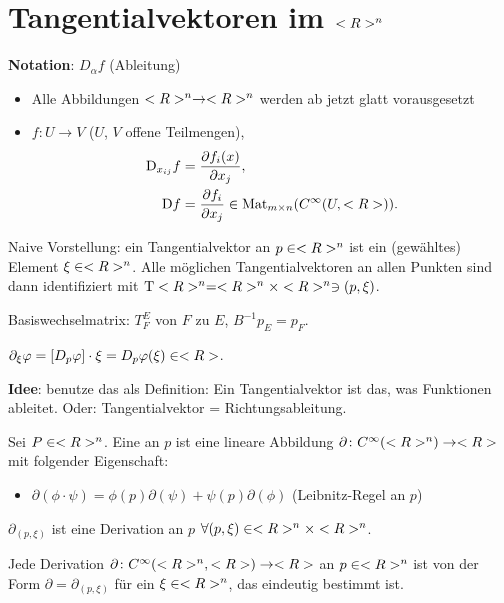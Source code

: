 \section{Tangentialvektoren im \texorpdfstring{$<R>^n$}{Rn}}

\textbf{Notation}: $D_\alpha f$ (Ableitung)\begin{itemize}
	\item Alle Abbildungen $<R>^n\to<R>^n$ werden ab jetzt glatt vorausgesetzt
	\item $f\colon U\to V$ ($U$, $V$ offene Teilmengen), \begin{align*}
		\mathrm D_{x_{ij}} f &= \frac{\partial f_i(x)}{\partial x_j},\\
		\mathrm D f &= \frac{\partial f_i}{\partial x_j}\in \operatorname{Mat}_{m\times n}(C^\infty(U,<R>)).
	\end{align*}
\end{itemize}

Naive Vorstellung: ein Tangentialvektor an $p\in<R>^n$ ist ein (gewähltes) Element $\xi\in<R>^n$. Alle möglichen Tangentialvektoren an allen Punkten sind dann identifiziert mit $\operatorname{T}<R>^n = <R>^n\times <R>^n\ni (p,\xi)$.

Basiswechselmatrix: $T^E_F$ von $F$ zu $E$, $B^{-1} p_E = p_F$.

$\partial_\xi \varphi = [D_p \varphi]\cdot\xi = D_p \varphi(\xi)\in <R>$.

\textbf{Idee}: benutze das als Definition: Ein Tangentialvektor ist das, was Funktionen ableitet. Oder: Tangentialvektor = Richtungsableitung.\begin{definition}
	Sei $P\in<R>^n$. Eine  an $p$ ist eine lineare Abbildung $\partial\colon C^\infty(<R>^n)\to<R>$ mit folgender Eigenschaft:\begin{itemize}
		\item $\partial(\phi\cdot\psi) = \phi(p)\partial(\psi) + \psi(p)\partial(\phi)$ (Leibnitz-Regel an $p$)
	\end{itemize}
\end{definition}

\begin{example}
	$\partial_{(p,\xi)}$ ist eine Derivation an $p$ $\forall (p,\xi)\in<R>^n\times<R>^n$.
\end{example}

\begin{proposition}
	Jede Derivation $\partial\colon C^\infty(<R>^n,<R>)\to<R>$ an $p\in <R>^n$ ist von der Form $\partial = \partial_{(p,\xi)}$ für ein $\xi\in<R>^n$, das eindeutig bestimmt ist.
\end{proposition}

